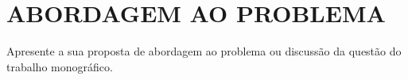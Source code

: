 \chapter{ABORDAGEM AO PROBLEMA}
 \label{cap3}
 \thispagestyle{empty}

Apresente a sua proposta de abordagem ao problema ou discussão da questão do trabalho monográfico.



